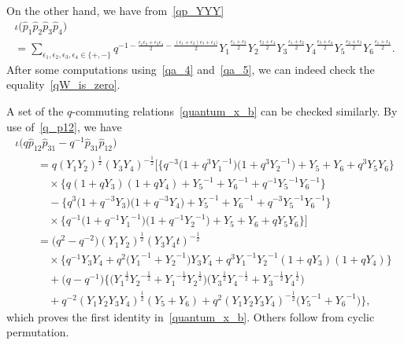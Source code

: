 \documentclass[pdftex]{sigma}
\numberwithin{equation}{section}
\begin{document}
On the other hand, we have from~\eqref{qp_YYY}
\begin{gather}
 \iota \big( \hat{p}_1 \hat{p}_2 \hat{p}_3 \hat{p}_4 \big) \label{qa_5}\\
 = \sum_{ \epsilon_1, \epsilon_2, \epsilon_3, \epsilon_4 \in \{+, -\} } q^{-1 - \frac{ \epsilon_1 \epsilon_2 + \epsilon_3 \epsilon_4 }{2} -\frac{( \epsilon_1 + \epsilon_2)
 \epsilon_3+\epsilon_4) }{2} } {Y_1}^{\frac{\epsilon_1+\epsilon_3}{2}} {Y_2}^{\frac{\epsilon_2+\epsilon_4}{2}} {Y_3}^{\frac{\epsilon_1+\epsilon_2}{2}} {Y_4}^{\frac{\epsilon_3+\epsilon_4}{2}}
 {Y_5}^{\frac{\epsilon_2+\epsilon_3}{2}} {Y_6}^{\frac{\epsilon_1+\epsilon_4}{2}} .\nonumber
\end{gather}
After some computations using~\eqref{qa_4} and~\eqref{qa_5}, we can indeed check the equality~\eqref{qW_is_zero}.

A set of the $q$-commuting relations~\eqref{quantum_x_b} can be checked similarly. By use of~\eqref{q_p12}, we have
\begin{gather*}
 \iota \big( q \hat{p}_{12} \hat{p}_{31} - q^{-1} \hat{p}_{31} \hat{p}_{12}\big) \\
\qquad{} = q ( Y_1 Y_2 )^{\frac{1}{2}} ( Y_3 Y_4)^{-\frac{1}{2}} \big[\big\{ q^{-3}\big( 1 + q^3 {Y_1}^{-1}\big)\big( 1 + q^3 {Y_2}^{-1}\big) + Y_5 + Y_6 + q^3 Y_5 Y_6\big\} \\
 \qquad\quad {} \times \big\{ q ( 1 + q Y_3)( 1 + q Y_4) + {Y_5}^{-1} +{Y_6}^{-1} + q^{-1} {Y_5}^{-1} {Y_6}^{-1}\big\} \\
\qquad\quad {} - \big\{ q^3 \big( 1 + q^{-3} Y_3 \big)\big( 1+ q^{-3} Y_4\big) + {Y_5}^{-1} + {Y_6}^{-1}+ q^{-3} {Y_5}^{-1} {Y_6}^{-1} \big\} \\
\qquad\quad {} \times \big\{ q^{-1} \big( 1 +q^{-1} {Y_1}^{-1} \big) \big( 1 + q^{-1} {Y_2}^{-1} \big) + Y_5 + Y_6 + q Y_5 Y_6 \big\}\big] \\
 \qquad{} = \big(q^2 - q^{-2}\big)( Y_1 Y_2)^{\frac{1}{2}} ( Y_3 Y_4t)^{- \frac{1}{2}} \\
\qquad\quad {} \times \big\{ q^{-1} Y_3 Y_4 + q^2 \big( {Y_1}^{-1} + {Y_2}^{-1}\big) Y_3 Y_4 + q^3 {Y_1}^{-1} {Y_2}^{-1} ( 1+ q Y_3 ) ( 1 + q Y_4)\big\} \\
\qquad\quad {} + \big( q- q^{-1}\big) \big\{ \big( {Y_1}^{\frac{1}{2}} {Y_2}^{-\frac{1}{2}} + {Y_1}^{-\frac{1}{2}} {Y_2}^{\frac{1}{2}}\big) \big(
 {Y_3}^{\frac{1}{2}} {Y_4}^{-\frac{1}{2}} + {Y_3}^{-\frac{1}{2}} {Y_4}^{\frac{1}{2}} \big) \\
\qquad\quad {} +q^{-2} ( Y_1 Y_2 Y_3 Y_4 )^{\frac{1}{2}} ( Y_5 + Y_6 ) + q^2 ( Y_1 Y_2 Y_3 Y_4)^{-\frac{1}{2}} \big( {Y_5}^{-1} + {Y_6}^{-1}\big) \big\} ,
\end{gather*}
which proves the first identity in~\eqref{quantum_x_b}. Others follow from cyclic permutation.
\end{document}
